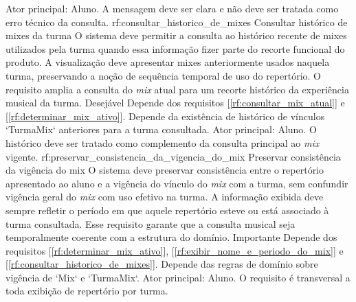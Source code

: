 {Ator principal: Aluno. A mensagem deve ser clara e não deve ser tratada como erro técnico da consulta.}
\reqfuncfull
{rf:consultar_historico_de_mixes}
{Consultar histórico de mixes da turma}
{O sistema deve permitir a consulta ao histórico recente de mixes utilizados pela turma quando essa informação fizer parte do recorte funcional do produto. A visualização deve apresentar mixes anteriormente usados naquela turma, preservando a noção de sequência temporal de uso do repertório. O requisito amplia a consulta do \textit{mix} atual para um recorte histórico da experiência musical da turma.}
{Desejável}
{Depende dos requisitos [\ref{rf:consultar_mix_atual}] e [\ref{rf:determinar_mix_ativo}]. Depende da existência de histórico de vínculos `TurmaMix` anteriores para a turma consultada.}
{Ator principal: Aluno. O histórico deve ser tratado como complemento da consulta principal ao \textit{mix} vigente.}
\reqfuncfull
{rf:preservar_consistencia_da_vigencia_do_mix}
{Preservar consistência da vigência do mix}
{O sistema deve preservar consistência entre o repertório apresentado ao aluno e a vigência do vínculo do \textit{mix} com a turma, sem confundir vigência geral do \textit{mix} com uso efetivo na turma. A informação exibida deve sempre refletir o período em que aquele repertório esteve ou está associado à turma consultada. Esse requisito garante que a consulta musical seja temporalmente coerente com a estrutura do domínio.}
{Importante}
{Depende dos requisitos [\ref{rf:determinar_mix_ativo}], [\ref{rf:exibir_nome_e_periodo_do_mix}] e [\ref{rf:consultar_historico_de_mixes}]. Depende das regras de domínio sobre vigência de `Mix` e `TurmaMix`.}
{Ator principal: Aluno. O requisito é transversal a toda exibição de repertório por turma.}

